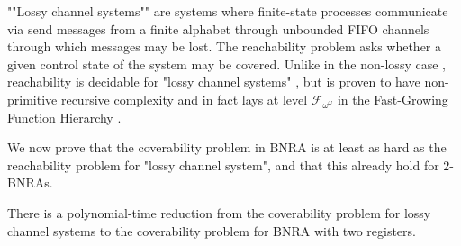 ""Lossy channel systems""  are systems where finite-state processes communicate via send messages from a finite alphabet through unbounded FIFO channels through which messages may be lost. The reachability problem asks whether a given control state of the system may be covered. Unlike in the non-lossy case \cite{BZ83}, reachability is decidable for "lossy channel systems" \cite{AK95,AbdullaJ1996undec}, but is proven to have non-primitive recursive complexity \cite{Schnoebelen2002verifying} and in fact lays at level $\mathcal{F}_{\omega^{\omega}}$ in the Fast-Growing Function Hierarchy \cite{ChambartS2008ordinal}.

We now prove that the coverability problem in BNRA is at least as hard as the reachability problem for "lossy channel system", and that this already hold for $2$-BNRAs.  
\begin{proposition}
	\label{prop:reduction-LCS}
	There is a polynomial-time reduction from the coverability problem for lossy channel systems to the coverability problem for BNRA with two registers.
\end{proposition}

